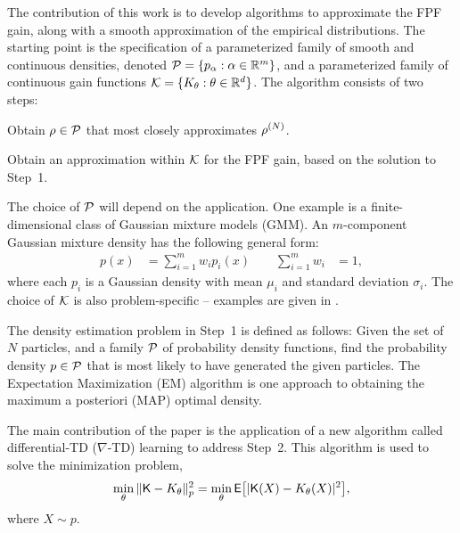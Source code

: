 The contribution of this work is to develop algorithms to approximate the FPF gain, along with a smooth approximation of the empirical distributions.  The starting point is the specification of a parameterized family  of smooth and continuous densities, denoted  ${\cal P} = \{ p_\alpha : \alpha\in\mathbb{R}^m\}$,  and a parameterized family of continuous gain functions ${\cal K} = \{K_\theta : \theta\in\mathbb{R}^d\}$.
The algorithm consists of two steps:
\begin{arabnum}
	\item Obtain $\rho\in{\cal P} $ that most closely approximates $\rho^{(N)}$.
	\item  Obtain an approximation within ${\cal K}$ for the FPF gain, based on the solution to Step~1.
\end{arabnum}
The choice of ${\cal P}$ will depend on the application.
One example is a finite-dimensional class of Gaussian mixture models (GMM). An $m$-component Gaussian mixture density has the following general form:
\begin{equation*}
\begin{aligned}
p(x)& = \sum_{i=1}^{m} w_{i} p_{i}(x) \qquad  \sum_{i=1}^{m} w_{i} &=1 ,
\label{gaussian_mix}
\end{aligned}
\end{equation*}
\noindent
where each $p_{i}$ is a Gaussian density with mean $\mu_{i}$ and standard deviation $\sigma_{i}$.
The choice of ${\cal K}$ is also problem-specific -- examples are given in .

The density estimation problem in Step~1 is defined as follows: Given the set of $N$ particles, and a family ${\cal P} $ of probability density functions,  find the probability density $p \in {\cal P} $ that is most likely to have generated the given particles.  The
Expectation Maximization (EM) algorithm is one approach to obtaining the maximum a posteriori (MAP) optimal density.

The main contribution of the paper is the application of a new algorithm called differential-TD ($\nabla$-TD) learning to address Step~2.   This algorithm is used to solve the minimization problem,
\begin{equation}
\min_{\param}\|\kFPF - K_\param\|_p^{2}
=
\min_{\param} \Expect\bigl[   | \kFPF (X) - K_\param(X) |^2 \bigr],
\label{e:gradTDgoal}
\end{equation}
where $X \sim p$.

